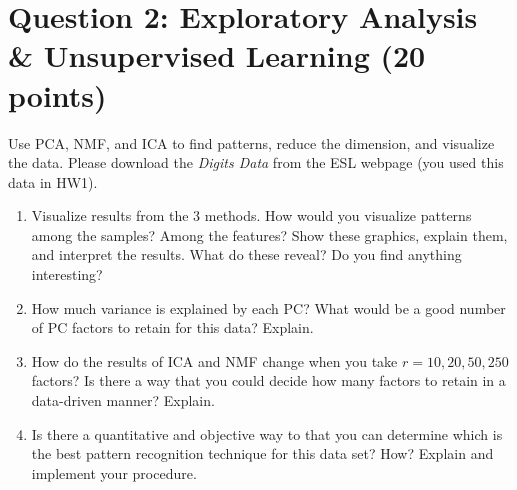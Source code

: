 \documentclass[10pt]{article}
\begin{document}
\section*{Question 2: Exploratory  Analysis \& Unsupervised Learning (20 points)}

Use PCA, NMF, and ICA to find patterns, reduce the dimension, and
visualize the data. Please download the \emph{Digits Data} from the ESL
webpage (you used this data in HW1).
\begin{enumerate}[label={(\alph*)}]
\item Visualize results from the 3 methods. How would you visualize
patterns among the samples? Among the features? Show these
graphics, explain them, and interpret the results. What do these
reveal? Do you find anything interesting?
\item How much variance is explained by each PC? What would be a good
number of PC factors to retain for this data? Explain.
\item How do the results of ICA and NMF change when you take $r=10, 20,
   50, 250$ factors? Is there a way that you could decide how many
factors to retain in a data-driven manner? Explain.
\item Is there a quantitative and objective way to that you can determine
which is the best pattern recognition technique for this data set?
How? Explain and implement your procedure.
\end{enumerate}
\end{document}
